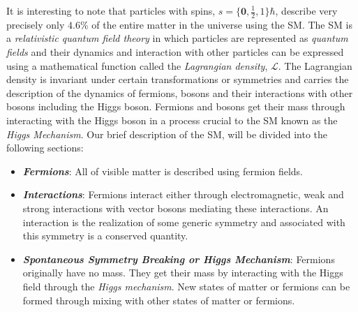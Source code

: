 It is interesting to note that particles with spins, $s =\Big\{\mathbf{0}, \frac{1}{2}, 1\Big\}\hbar$, describe very precisely only $4.6$\% of the entire matter in the universe using the SM. 
The SM is a \textit{relativistic quantum field theory} in which particles are represented as \textit{quantum fields} and their dynamics and interaction with other particles can be expressed using a mathematical function called  the \textit{Lagrangian density}, $\mathcal{L}$. The Lagrangian density is invariant under certain transformations or symmetries and carries the description of the dynamics of fermions, bosons and their interactions with other bosons including the Higgs boson. Fermions and bosons get their mass through interacting with the Higgs boson in a process crucial to the SM known as  the \textit{Higgs Mechanism}.
Our brief description of the SM, will be divided into the following sections:
\begin{itemize}
\item \textbf{\textit{Fermions}}: All of visible matter is described using fermion fields.
\item \textbf{\textit{Interactions}}: Fermions interact either through electromagnetic, weak and strong interactions with vector bosons mediating  these interactions. An interaction is the realization of some generic symmetry and associated with this symmetry is a conserved quantity.
\item \textbf{\textit{Spontaneous Symmetry Breaking or Higgs Mechanism}}: Fermions originally have no mass. They get their mass by interacting with the Higgs field through the \textit{Higgs mechanism}. New states of matter or fermions can be formed through mixing with other states of matter or fermions.

\end{itemize}
